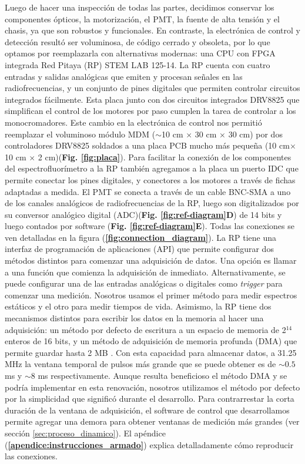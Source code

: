 Luego de hacer una inspección de todas las partes, decidimos conservar los componentes ópticos, la motorización, el PMT, la fuente de alta tensión y el chasis, ya que son robustos y funcionales.  
En contraste, la electrónica de control y detección resultó ser voluminosa, de código cerrado y obsoleta, por lo que optamos por reemplazarla con alternativas modernas: una CPU con FPGA integrada Red Pitaya (RP) STEM LAB 125-14.
La RP cuenta con cuatro entradas y salidas analógicas que emiten y procesan señales en las radiofrecuencias, y un conjunto de pines digitales que permiten controlar circuitos integrados fácilmente.
Esta placa junto con dos circuitos integrados DRV8825 que simplifican el control de los motores por paso cumplen la tarea de controlar a los monocromadores.
Este cambio en la electrónica de control nos permitió reemplazar el voluminoso módulo MDM ($\sim$10 cm $\times$ 30 cm $\times$ 30 cm) por dos controladores DRV8825 soldados a una placa PCB mucho más pequeña (10 cm$\times$ 10 cm $\times$ 2 cm)(\textbf{Fig. \ref{fig:placa}}).
Para facilitar la conexión de los componentes del espectrofluorímetro a la RP también agregamos a la placa un puerto IDC que permite conectar los pines digitales, y conectores a los motores a través de fichas adaptadas a medida.
El PMT se conecta a través de un cable BNC-SMA a uno de los canales analógicos de radiofrecuencias de la RP, luego son digitalizados por su conversor analógico digital (ADC)(\textbf{Fig. \ref{fig:ref-diagram}D}) de 14 bits y luego contados por software (\textbf{Fig. \ref{fig:ref-diagram}E}).
Todas las conexiones se ven detalladas en la figura (\textbf{\ref{fig:connection_diagram}}).
La RP tiene una interfaz de programación de aplicaciones (API) que permite configurar dos métodos distintos para comenzar una adquisición de datos.
Una opción es llamar a una función que comienza la adquisición de inmediato.
Alternativamente, se puede configurar una de las entradas analógicas o digitales como \textit{trigger} para comenzar una medición.
Nosotros usamos el primer método para medir espectros estáticos y el otro para medir tiempos de vida.
Asimismo, la RP tiene dos mecanismos distintos para escribir los datos en la memoria al hacer una adquisición: un método por defecto de escritura a un espacio de memoria de 2$^{14}$ enteros de 16 bits, y un método de adquisición de memoria profunda (DMA) que permite guardar hasta 2 MB \cite{DMA_rp}.
Con esta capacidad para almacenar datos, a 31.25 MHz la ventana temporal de pulsos más grande que se puede obtener es de $\sim 0.5$ ms y $\sim 8$ ms respectivamente.
Aunque resulta beneficioso el método DMA y se podría implementar en esta renovación, nosotros utilizamos el método por defecto por la simplicidad que significó durante el desarrollo.
Para contrarrestar la corta duración de la ventana de adquisición, el software de control que desarrollamos permite agregar una demora para obtener ventanas de medición más grandes (ver sección \ref{sec:proceso_dinamico}).
El apéndice (\textbf{\ref{apendice:instrucciones_armado}}) explica detalladamente cómo reproducir las conexiones.

